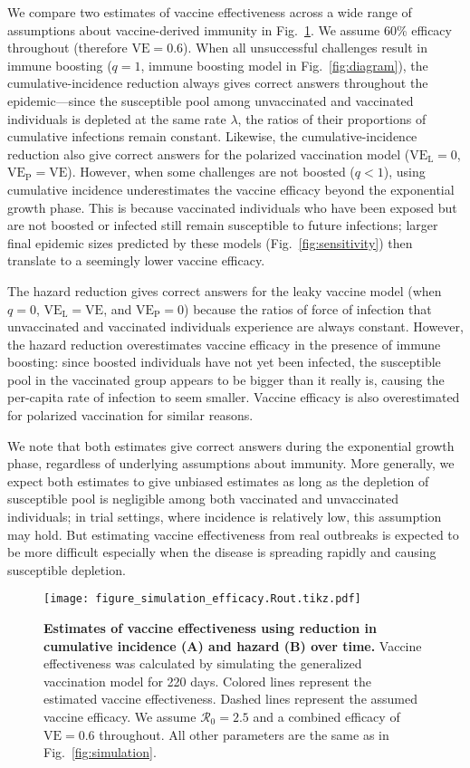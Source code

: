 \documentclass[12pt]{article}
\newcommand{\fref}[1]{Fig.~\ref{fig:#1}}
\newcommand{\Rx}[1]{\ensuremath{{\mathcal R}_{#1}}\xspace}
\newcommand{\Ro}{\Rx{0}}
\newcommand{\VE}{\ensuremath{\mathrm{VE}}}
\newcommand{\VEP}{\ensuremath{\VE_{\mathrm{P}}}}
\newcommand{\VEL}{\ensuremath{\VE_{\mathrm{L}}}}
\begin{document}
We compare two estimates of vaccine effectiveness across a wide range of assumptions about vaccine-derived immunity in \fref{efficacy}.
We assume 60\% efficacy throughout (therefore $\VE = 0.6$).
When all unsuccessful challenges result in immune boosting ($q=1$, immune boosting model in \fref{diagram}), the cumulative-incidence reduction always gives correct answers throughout the epidemic---since the susceptible pool among unvaccinated and vaccinated individuals is depleted at the same rate $\lambda$, the ratios of their proportions of cumulative infections remain constant.
Likewise, the cumulative-incidence reduction also give correct answers for the polarized vaccination model ($\VEL = 0$, $\VEP = \VE$).
However, when some challenges are not boosted ($q < 1$), using cumulative incidence underestimates the vaccine efficacy beyond the exponential growth phase.
This is because vaccinated individuals who have been exposed but are not boosted or infected still remain susceptible to future infections; 
larger final epidemic sizes predicted by these models (\fref{sensitivity}) then translate to a seemingly lower vaccine efficacy.

The hazard reduction gives correct answers for the leaky vaccine model (when $q=0$, $\VEL = \VE$, and $\VEP = 0$) because the ratios of force of infection that unvaccinated and vaccinated individuals experience are always constant.
However, the hazard reduction overestimates vaccine efficacy in the presence of immune boosting: since boosted individuals have not yet been infected, the susceptible pool in the vaccinated group appears to be bigger than it really is, causing the per-capita rate of infection to seem smaller.
Vaccine efficacy is also overestimated for polarized vaccination for similar reasons.

We note that both estimates give correct answers during the exponential growth phase, regardless of underlying assumptions about immunity.
More generally, we expect both estimates to give unbiased estimates as long as the depletion of susceptible pool is negligible among both vaccinated and unvaccinated individuals;
in trial settings, where incidence is relatively low, this assumption may hold.
But estimating vaccine effectiveness from real outbreaks is expected to be more difficult especially when the disease is spreading rapidly and causing susceptible depletion.

\begin{figure}[!th]
\texttt{[image: figure\_simulation\_efficacy.Rout.tikz.pdf]}
\caption{
\textbf{Estimates of vaccine effectiveness using reduction in cumulative incidence (A) and hazard (B) over time.}
Vaccine effectiveness was calculated by simulating the generalized vaccination model for 220 days. 
Colored lines represent the estimated vaccine effectiveness.
Dashed lines represent the assumed vaccine efficacy.
We assume $\Ro = 2.5$ and a combined efficacy of $\VE = 0.6$ throughout. 
All other parameters are the same as in \fref{simulation}.
\label{fig:efficacy}
}
\end{figure}
\end{document}

